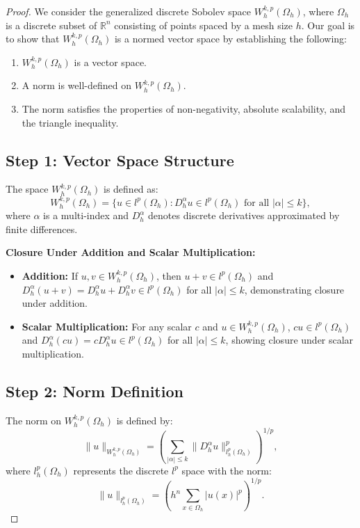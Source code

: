 \documentclass[11pt,a4paper]{article}
\theoremstyle{plain}
\theoremstyle{definition}
\theoremstyle{remark}
\begin{document}
\begin{proof}

We consider the generalized discrete Sobolev space $W^{k,p}_h(\Omega_h)$, where $\Omega_h$ is a discrete subset of $\mathbb{R}^n$ consisting of points spaced by a mesh size $h$. Our goal is to show that $W^{k,p}_h(\Omega_h)$ is a normed vector space by establishing the following:
\begin{enumerate}
    \item $W^{k,p}_h(\Omega_h)$ is a vector space.
    \item A norm is well-defined on $W^{k,p}_h(\Omega_h)$.
    \item The norm satisfies the properties of non-negativity, absolute scalability, and the triangle inequality.
\end{enumerate}

\subsection*{Step 1: Vector Space Structure}
The space $W^{k,p}_h(\Omega_h)$ is defined as:
\[ W^{k,p}_h(\Omega_h) = \{ u \in l^p(\Omega_h) : D^\alpha_h u \in l^p(\Omega_h) \text{ for all } |\alpha| \leq k \}, \]
where $\alpha$ is a multi-index and $D^\alpha_h$ denotes discrete derivatives approximated by finite differences.

\textbf{Closure Under Addition and Scalar Multiplication:}
\begin{itemize}
    \item \textbf{Addition:} If $u, v \in W^{k,p}_h(\Omega_h)$, then $u + v \in l^p(\Omega_h)$ and $D^\alpha_h (u + v) = D^\alpha_h u + D^\alpha_h v \in l^p(\Omega_h)$ for all $|\alpha| \leq k$, demonstrating closure under addition.
    \item \textbf{Scalar Multiplication:} For any scalar $c$ and $u \in W^{k,p}_h(\Omega_h)$, $cu \in l^p(\Omega_h)$ and $D^\alpha_h (cu) = c D^\alpha_h u \in l^p(\Omega_h)$ for all $|\alpha| \leq k$, showing closure under scalar multiplication.
\end{itemize}

\subsection*{Step 2: Norm Definition}
The norm on $W^{k,p}_h(\Omega_h)$ is defined by:
\[ \|u\|_{W^{k,p}_h(\Omega_h)} = \left( \sum_{|\alpha| \leq k} \|D^\alpha_h u\|_{l^p_h(\Omega_h)}^p \right)^{1/p}, \]
where $l^p_h(\Omega_h)$ represents the discrete $l^p$ space with the norm:
\[ \|u\|_{l^p_h(\Omega_h)} = \left( h^n \sum_{x \in \Omega_h} |u(x)|^p \right)^{1/p}. \]


\end{proof}
\end{document}

